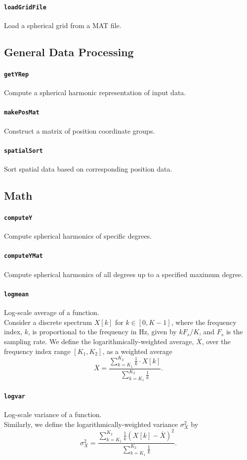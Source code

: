 \documentclass[11pt, oneside]{article}
\newcommand{\function}[1]{\paragraph*{\texttt{#1}}}
\begin{document}
\function{loadGridFile} Load a spherical grid from a MAT file. \\

\subsection{General Data Processing}

\function{getYRep} Compute a spherical harmonic representation of input data. \\

\function{makePosMat} Construct a matrix of position coordinate groups. \\

\function{spatialSort} Sort spatial data based on corresponding position data. \\

\subsection{Math}

\function{computeY} Compute spherical harmonics of specific degrees. \\

\function{computeYMat} Compute spherical harmonics of all degrees up to a specified maximum degree. \\

\function{logmean} Log-scale average of a function. \\
Consider a discrete spectrum $X[k]$ for $k \in [0, K-1]$, where the frequency index, $k$, is proportional to the frequency in Hz, given by $k F_s/K$, and $F_s$ is the sampling rate.
We define the logarithmically-weighted average, $\overline{X}$, over the frequency index range $[K_1, K_2]$, as a weighted average
\begin{equation}\label{eq:logmean}
\overline{X} = \frac{\displaystyle \sum_{k=K_1}^{K_2} \frac{1}{k} \cdot X[k]}{\displaystyle \sum_{k=K_1}^{K_2} \frac{1}{k}}.
\end{equation}

\function{logvar} Log-scale variance of a function. \\
Similarly, we define the logarithmically-weighted variance $\sigma_X^2$ by
\begin{equation}\label{eq:logvar}
\sigma_X^2 = \frac{\displaystyle \sum_{k=K_1}^{K_2} \frac{1}{k} \left( X[k] - \overline{X} \right)^2}{\displaystyle \sum_{k=K_1}^{K_2} \frac{1}{k}}.
\end{equation}
\end{document}
